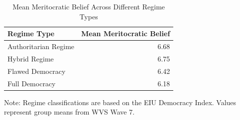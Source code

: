 \begin{table}[!h]
\centering
\caption{Mean Meritocratic Belief Across Different Regime Types}
\centering
\begin{threeparttable}
\fontsize{10}{12}\selectfont
\begin{tabular}[t]{lr}
\toprule
Regime Type & Mean Meritocratic Belief\\
\midrule
Authoritarian Regime & 6.68\\
Hybrid Regime & 6.75\\
Flawed Democracy & 6.42\\
Full Democracy & 6.18\\
\bottomrule
\end{tabular}
\begin{tablenotes}
\small
\item Note: Regime classifications are based on the EIU Democracy Index. Values represent group means from WVS Wave 7.
\end{tablenotes}
\end{threeparttable}
\end{table}
